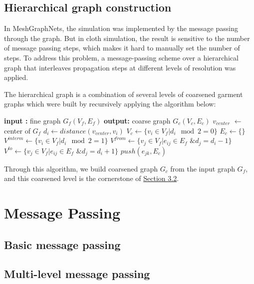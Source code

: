 \documentclass{article}
\begin{document}
\subsection{Hierarchical graph construction}
\par In MeshGraphNets\cite{pfaff2021learning}, the simulation was implemented by the message passing through the graph. But in cloth simulation, the result is sensitive to the number of message passing steps, which makes it hard to manually set the number of steps. To address this problem, a message-passing scheme over a hierarchical graph that interleaves propagation steps at different levels of resolution was applied.
\par The hierarchical graph is a combination of several levels of coarsened garment graphs which were built by recursively applying the algorithm below:
\newpage
\begin{algorithmic}[1]
    \State \textbf{input :} fine graph $G_f(V_f,E_f)$
    \State \textbf{output:} coarse graph $G_c(V_c,E_c)$
    \State $v_{center}$ $\gets$ center of $G_f$
        \State $d_i \gets distance(v_{center}, v_i)$
    \EndFor
    \State $V_c \gets \{v_i \in V_f | d_i \mod 2 = 0\}$
    \State $E_c \gets \{\}$
    \State $V^{interm} \gets \{v_i \in V_f | d_i \mod 2 = 1\}$
        \State $V^{from} \gets \{v_j \in V_f | e_{ij} \in E_f \text{ \& } d_j = d_i - 1\}$
        \State $V^{to} \gets \{v_j \in V_f | e_{ij} \in E_f \text{ \& } d_j = d_i + 1\}$
                \State $push(e_{jk}, E_c)$
            \EndFor
        \EndFor
    \EndFor
\end{algorithmic}
\par Through this algorithm, we build coarsened graph $G_c$ from the input graph $G_f$, and this coarsened level is the cornerstone of \href{sec:MLMP}{Section 3.2}.
\section{Message Passing}
\subsection{Basic message passing}
\subsection{Multi-level message passing}
\label{sec:MLMP}
\end{document}
